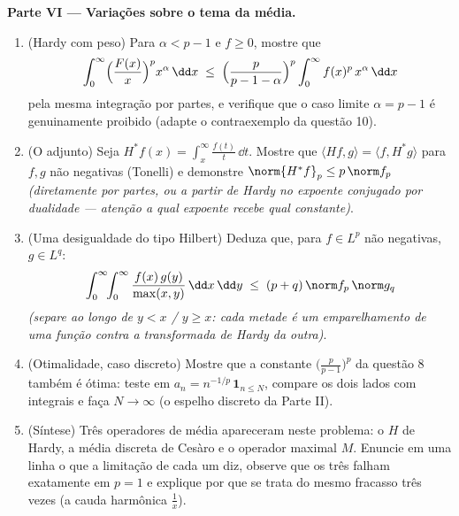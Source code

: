 \begin{problem}
\medskip
\noindent\textbf{Parte VI --- Variações sobre o tema da média.}
\begin{enumerate}[resume]
  \item (Hardy com peso) Para $\alpha < p - 1$ e $f \geq 0$, mostre que
        \[
        \int_0^\infty\Bigl(\frac{F(x)}x\Bigr)^{p}
        x^{\alpha}\,\dd x \;\leq\;
        \Bigl(\frac{p}{p - 1 - \alpha}\Bigr)^{p}
        \int_0^\infty f(x)^p\,x^{\alpha}\,\dd x
        \]
        pela mesma integração por partes, e verifique que o caso limite
        $\alpha = p - 1$ é genuinamente proibido (adapte o contraexemplo da questão
        10).
  \item (O adjunto) Seja $H^*f(x) =
        \int_x^{\infty}\frac{f(t)}t\,\dd t$. Mostre que $\langle
        Hf, g\rangle = \langle f, H^*g\rangle$ para $f, g$ não
        negativas (Tonelli) e demonstre $\norm{H^*f}_p \leq p\,\norm f_p$ \emph{(diretamente por
        partes, ou a partir de Hardy no expoente conjugado por
        dualidade --- atenção a qual expoente recebe qual constante)}.
  \item (Uma desigualdade do tipo Hilbert) Deduza que, para $f \in L^p$ não
        negativas, $g \in L^q$:
        \[
        \int_0^\infty\!\!\int_0^\infty
        \frac{f(x)\,g(y)}{\max(x,y)}\,\dd x\,\dd y
        \;\leq\; (p + q)\,\norm f_p\,\norm g_q
        \]
        \emph{(separe ao longo de $y < x$ / $y \geq x$: cada metade é um
        emparelhamento de uma função contra a transformada de Hardy da
        outra)}.
  \item (Otimalidade, caso discreto) Mostre que a constante $\bigl(\frac p{p-1}\bigr)^p$ da
        questão 8 também é ótima: teste em $a_n = n^{-1/p}\,\mathbf 1_{n \leq
        N}$, compare os dois lados
        com integrais e faça $N
        \to \infty$ (o espelho discreto da Parte II).
  \item (Síntese) Três operadores de média apareceram neste problema:
        o $H$ de Hardy, a média discreta de Cesàro e o operador
        maximal $M$. Enuncie em uma linha o que a limitação de cada
        um diz, observe que os três falham exatamente em $p = 1$ e
        explique por que se trata do mesmo fracasso três vezes (a cauda
        harmônica $\frac1x$).
\end{enumerate}


\end{problem}

